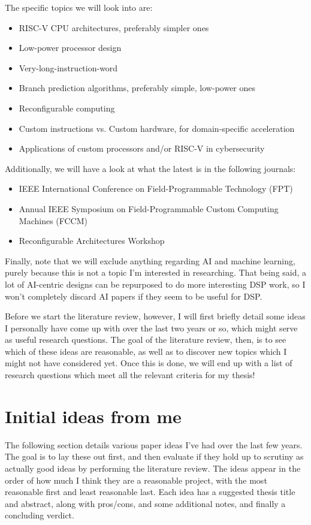 \documentclass[12pt]{article}
\begin{document}
The specific topics we will look into are:
\begin{itemize}
    \item RISC-V CPU architectures, preferably simpler ones
    \item Low-power processor design
    \item Very-long-instruction-word
    \item Branch prediction algorithms, preferably simple, low-power ones
    \item Reconfigurable computing
    \item Custom instructions vs. Custom hardware, for domain-specific acceleration
    \item Applications of custom processors and/or RISC-V in cybersecurity
\end{itemize}

Additionally, we will have a look at what the latest is in the following journals:
\begin{itemize}
    \item IEEE International Conference on Field-Programmable Technology (FPT)
    \item Annual IEEE Symposium on Field-Programmable Custom Computing Machines (FCCM) 
    \item Reconfigurable Architectures Workshop
\end{itemize}

Finally, note that we will exclude anything regarding AI and machine learning, purely because this is not
a topic I'm interested in researching. That being said, a lot of AI-centric designs can be repurposed to do
more interesting DSP work, so I won't completely discard AI papers if they seem to be useful for DSP.

Before we start the literature review, however, I will first briefly detail some ideas I personally have
come up with over the last two years or so, which might serve as useful research questions. The goal of the
literature review, then, is to see which of these ideas are reasonable, as well as to discover new topics
which I might not have considered yet. Once this is done, we will end up with a list of research questions
which meet all the relevant criteria for my thesis!

\section{Initial ideas from me}
The following section details various paper ideas I've had over the last few years. The goal is to lay
these out first, and then evaluate if they hold up to scrutiny as actually good ideas by performing the
literature review. The ideas appear in the order of how much I think they are a reasonable project, with
the most reasonable first and least reasonable last. Each idea has a suggested thesis title and abstract,
along with pros/cons, and some additional notes, and finally a concluding verdict.
\end{document}
